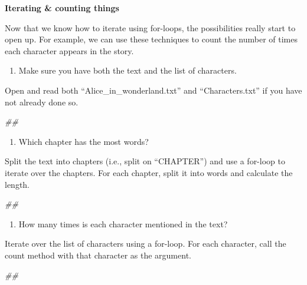 \documentclass[
]{book}
\newenvironment{Shaded}{\begin{snugshade}}{\end{snugshade}}
\newcommand{\CommentTok}[1]{\textcolor[rgb]{0.56,0.35,0.01}{\textit{#1}}}
\providecommand{\tightlist}{%
  \setlength{\itemsep}{0pt}\setlength{\parskip}{0pt}}
\begin{document}
\textbf{Iterating \& counting things}

Now that we know how to iterate using for-loops, the possibilities really start to open up. For example, we can use these techniques to count the number of times each character appears in the story.

\begin{enumerate}
\def\labelenumi{\arabic{enumi}.}
\tightlist
\item
  Make sure you have both the text and the list of characters.
\end{enumerate}

Open and read both ``Alice\_in\_wonderland.txt'' and
``Characters.txt'' if you have not already done so.

\begin{Shaded}
\begin{Highlighting}[]
\CommentTok{\#\#}
\end{Highlighting}
\end{Shaded}

\begin{enumerate}
\def\labelenumi{\arabic{enumi}.}
\setcounter{enumi}{1}
\tightlist
\item
  Which chapter has the most words?
\end{enumerate}

Split the text into chapters (i.e., split on ``CHAPTER'') and use a for-loop to iterate over the chapters.
For each chapter, split it into words and calculate the length.

\begin{Shaded}
\begin{Highlighting}[]
\CommentTok{\#\#}
\end{Highlighting}
\end{Shaded}

\begin{enumerate}
\def\labelenumi{\arabic{enumi}.}
\setcounter{enumi}{2}
\tightlist
\item
  How many times is each character mentioned in the text?
\end{enumerate}

Iterate over the list of characters using a for-loop.
For each character, call the count method with that character as the argument.

\begin{Shaded}
\begin{Highlighting}[]
\CommentTok{\#\#}
\end{Highlighting}
\end{Shaded}
\end{document}
